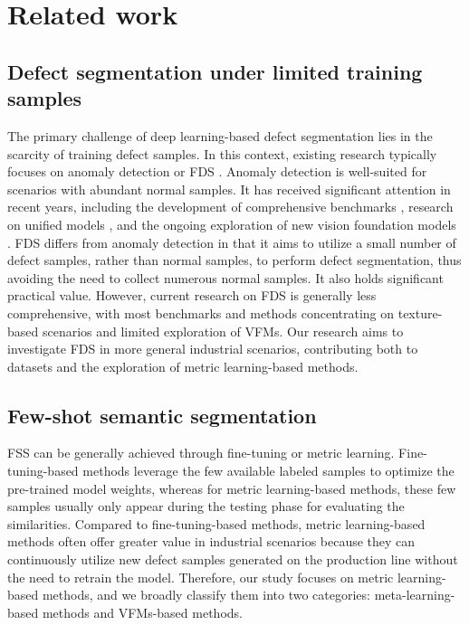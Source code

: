 \section{Related work}
\subsection{Defect segmentation under limited training samples}
The primary challenge of deep learning-based defect segmentation lies in the scarcity of training defect samples. In this context, existing research typically focuses on anomaly detection  \cite{liu2024deep} or FDS \cite{bao2021triplet,yu2022selective,yao2024few}. Anomaly detection is well-suited for scenarios with abundant normal samples. It has received significant attention in recent years, including the development of comprehensive benchmarks \cite{bergmann2019mvtec, bergmann2021mvtec, zou2022spot}, research on unified models \cite{10574313,you2022unified}, and the ongoing exploration of new vision foundation models \cite{roth2022towards,jeong2023winclip,cao2023towards,li2024clipsam}. FDS differs from anomaly detection in that it aims to utilize a small number of defect samples, rather than normal samples, to perform defect segmentation, thus avoiding the need to collect numerous normal samples. It also holds significant practical value. However, current research on FDS is generally less comprehensive, with most benchmarks \cite{bao2021triplet,yao2024few} and methods concentrating on texture-based scenarios and limited exploration of VFMs. Our research aims to investigate FDS in more general industrial scenarios, contributing both to datasets and the exploration of metric learning-based methods. 



\subsection{Few-shot semantic segmentation}
FSS can be generally achieved through fine-tuning \cite{nakamura2019revisiting} or metric learning. Fine-tuning-based methods leverage the few available labeled samples to optimize the pre-trained model weights, whereas for metric learning-based methods, these few samples usually only appear during the testing phase for evaluating the similarities. Compared to fine-tuning-based methods, metric learning-based methods often offer greater value in industrial scenarios because they can continuously utilize new defect samples generated on the production line without the need to retrain the model. Therefore, our study focuses on metric learning-based methods, and we broadly classify them into two categories: meta-learning-based methods and VFMs-based methods. 



